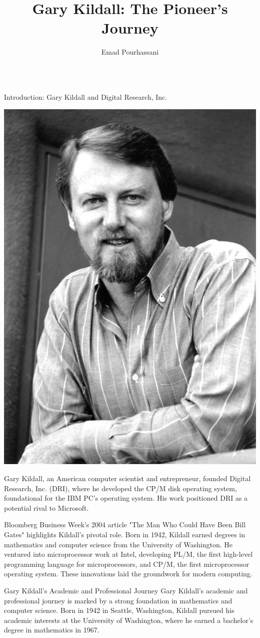 \documentclass{beamer}
\title[small title]{\texorpdfstring{Gary Kildall: The Pioneer's Journey}
{Main Title}}
\author{Emad Pourhassani}
\institute{K. N. Toosi University of Technology}
\begin{document}
\small

\begin{frame}[t]{}
\vskip -1cm
\begin{columns}

\begin{column}[T]{0.27\textwidth}

\begin{block}{\large Introduction: Gary Kildall and Digital Research, Inc.}
  \begin{center}
    \includegraphics[width=0.5\linewidth]{images/gary.jpg} %
\end{center}
Gary Kildall, an American computer scientist and entrepreneur, founded Digital Research, Inc. (DRI), where he developed the CP/M disk operating system, foundational for the IBM PC's operating system. His work positioned DRI as a potential rival to Microsoft.

Bloomberg Business Week's 2004 article "The Man Who Could Have Been Bill Gates" highlights Kildall's pivotal role. Born in 1942, Kildall earned degrees in mathematics and computer science from the University of Washington. He ventured into microprocessor work at Intel, developing PL/M, the first high-level programming language for microprocessors, and CP/M, the first microprocessor operating system. These innovations laid the groundwork for modern computing.\cite{giants}

\end{block}

\begin{block}{\large Gary Kildall's Academic and Professional Journey}
Gary Kildall's academic and professional journey is marked by a strong foundation in mathematics and computer science. Born in 1942 in Seattle, Washington, Kildall pursued his academic interests at the University of Washington, where he earned a bachelor's degree in mathematics in 1967.


\end{block}
\end{column}
\end{columns}
\end{frame}
\end{document}
